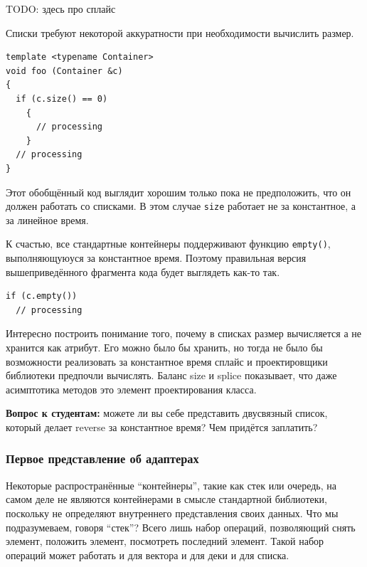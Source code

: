 \documentclass[a4paper,12pt,oneside]{article}
\newif\ifanswers
\begin{document}
TODO: здесь про сплайс

Списки требуют некоторой аккуратности при необходимости вычислить размер.

\begin{lstlisting}
template <typename Container> 
void foo (Container &c) 
{
  if (c.size() == 0)
    {
      // processing
    }
  // processing
}
\end{lstlisting}

Этот обобщённый код выглядит хорошим только пока не предположить, что он должен работать со списками. В этом случае \lstinline!size! работает не за константное, а за линейное время.

К счастью, все стандартные контейнеры поддерживают функцию \lstinline!empty()!, выполняющуюуся за константное время. Поэтому правильная версия вышеприведённого фрагмента кода будет выглядеть как-то так.

\begin{lstlisting}
if (c.empty())
  // processing
\end{lstlisting}

Интересно построить понимание того, почему в списках размер вычисляется а не хранится как атрибут. Его можно было бы хранить, но тогда не было бы возможности реализовать за константное время сплайс и проектировщики библиотеки предпочли вычислять. Баланс size и splice показывает, что даже асимптотика методов это элемент проектирования класса.

\textbf{Вопрос к студентам:} можете ли вы себе представить двусвязный список, который делает reverse за константное время? Чем придётся заплатить?

\ifanswers
Например хранить в списке поле direction и сверяться с ним при переходе к next для выбора конкретной связи для перехода. Цена в общем-то невелика, но обычно её не платят, уж больно reverse специфичная и редко нужная штука.
\fi

\subsubsection{Первое представление об адаптерах}

Некоторые распространённые ``контейнеры'', такие как стек или очередь, на самом деле не являются контейнерами в смысле стандартной библиотеки, поскольку не определяют внутреннего представления своих данных. Что мы подразумеваем, говоря ``стек''? Всего лишь набор операций, позволяющий снять элемент, положить элемент, посмотреть последний элемент. Такой набор операций может работать и для вектора и для деки и для списка.
\end{document}
